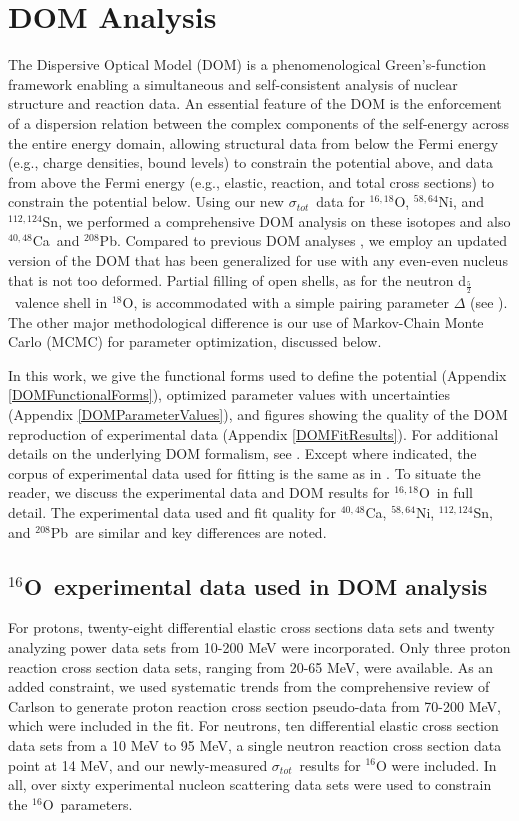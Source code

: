 \documentclass[twocolumn,secnumarabic,amssymb, nobibnotes, aps, prl,
superscriptaddress, nobalancelastpage]{revtex4}
\newcommand{\tot}{\ensuremath{\sigma_{tot}}}
\newcommand{\oSix}{\ensuremath{^{16}}O}
\newcommand{\oEight}{\ensuremath{^{18}}O}
\newcommand{\oSixEight}{\ensuremath{^{16,18}}O}
\newcommand{\caAughtEight}{\ensuremath{^{40,48}}C\lowercase{a}}
\newcommand{\niEightFour}{\ensuremath{^{58,64}}N\lowercase{i}}
\newcommand{\snTwelveFour}{\ensuremath{^{112,124}}S\lowercase{n}}
\newcommand{\pbEight}{\ensuremath{^{208}}P\lowercase{b}}
\newcommand{\dFive}{d\ensuremath{_{\frac{5}{2}}}}
\begin{document}
\section{DOM Analysis}
The Dispersive Optical Model (DOM) is a phenomenological Green's-function
framework enabling a simultaneous and self-consistent analysis of nuclear
structure and reaction data. An essential feature of the DOM is the enforcement of a dispersion
relation between the complex components of the self-energy across the entire
energy domain, allowing structural data from below the Fermi energy
(e.g., charge densities, bound levels) to constrain the potential above,
and data from above the Fermi energy (e.g., elastic, reaction, and total
cross sections) to constrain the potential
below. Using our new \tot\ data for \oSixEight, \niEightFour, and \snTwelveFour, we
performed a comprehensive DOM analysis on these isotopes and also
\caAughtEight\ and \pbEight. Compared to previous DOM
analyses \cite{Mueller2011, Atkinson2017, Mahzoon2014, Mahzoon2017},
we employ an updated version of the DOM that has been generalized for use with
any even-even nucleus that is not too deformed. Partial filling of open shells,
as for the neutron \dFive\ valence shell in \oEight, is accommodated with a simple
pairing parameter $\Delta$ (see \cite{PruittPhDThesis}). The other major
methodological difference is our use of Markov-Chain Monte Carlo (MCMC) for
parameter optimization, discussed below. 

In this work, we give the functional forms used to define the
potential (Appendix \ref{DOMFunctionalForms}), optimized parameter values with
uncertainties (Appendix \ref{DOMParameterValues}), and figures showing the quality
of the DOM reproduction of experimental data (Appendix \ref{DOMFitResults}).
For additional details on the underlying DOM formalism, see \cite{Mahaux1991,
Dickhoff2018}. Except where indicated, the corpus of experimental data used for
fitting is the same as in \cite{PruittPhDThesis}. To situate the reader, we discuss the
experimental data and DOM results for \oSixEight\ in full detail. The
experimental data used and fit quality for \caAughtEight, \niEightFour,
\snTwelveFour, and \pbEight\ are similar and key differences are noted.

\subsection{\oSix\ experimental data used in DOM analysis}
For protons, twenty-eight differential elastic cross
sections data sets and twenty analyzing power data sets from 10-200 MeV were
incorporated. Only three proton reaction cross section data sets, ranging from 20-65 MeV,
were available. As an added constraint, we used systematic trends
from the comprehensive review of Carlson \cite{Carlson1975} to generate proton
reaction cross section pseudo-data from 70-200 MeV, which were included in the fit.
For neutrons, ten differential elastic cross section
data sets from a 10 MeV to 95 MeV, a single
neutron reaction cross section data point at 14 MeV, and our newly-measured \tot\ results
for $^{16}$O were included. In all, over sixty experimental nucleon scattering
data sets were used to constrain the \oSix\ parameters.
\end{document}
